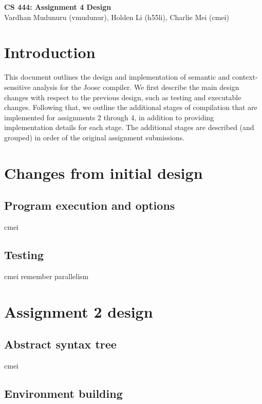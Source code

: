 \documentclass[12pt]{article}
\begin{document}
\begin{center}
  \textbf{\Large{CS 444: Assignment 4 Design}} \\
  \vspace{5pt}
  Vardhan Mudunuru (vmudunur), Holden Li (h55li), Charlie Mei (cmei) \\
\end{center}
\vspace{5pt}

\section*{Introduction}

This document outlines the design and implementation of semantic and
context-sensitive analysis for the Joosc compiler. We first describe the main
design changes with respect to the previous design, such as testing and
executable changes. Following that, we outline the additional stages of
compilation that are implemented for assignments 2 through 4, in addition to
providing implementation details for each stage. The additional stages are
described (and grouped) in order of the original assignment submissions.

\section{Changes from initial design}

\subsection{Program execution and options}
cmei

\subsection{Testing}
cmei
remember parallelism

\section{Assignment 2 design}

\subsection{Abstract syntax tree}
cmei

\subsection{Environment building}
\end{document}
